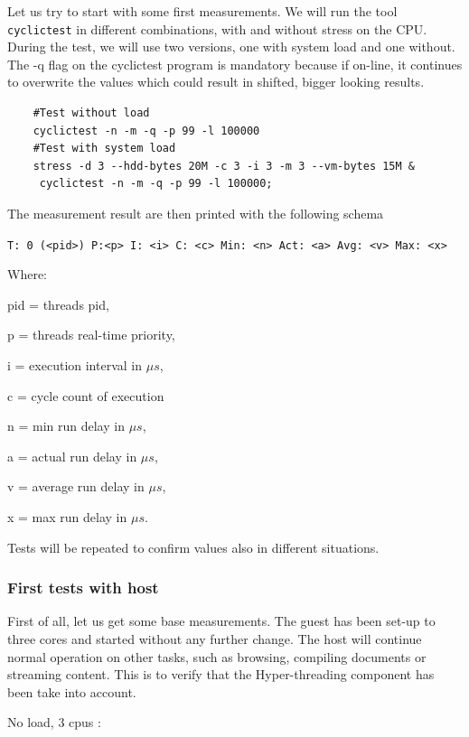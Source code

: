 \documentclass[]{scrartcl}
\begin{document}
Let us try to start with some first measurements. We will run the tool \texttt{cyclictest} in different combinations, with and without stress on the CPU. During the test, we will use two versions, one with system load and one without. The -q flag on the cyclictest program is mandatory because if on-line, it continues to overwrite the values which could result in shifted, bigger looking results.

\begin{verbatim}
	#Test without load
	cyclictest -n -m -q -p 99 -l 100000
	#Test with system load
	stress -d 3 --hdd-bytes 20M -c 3 -i 3 -m 3 --vm-bytes 15M &
	 cyclictest -n -m -q -p 99 -l 100000;
\end{verbatim}

The measurement result are then printed with the following schema
\bigskip

\noindent \small \texttt{T: 0 (<pid>) P:<p> I: <i> C: <c> Min: <n> Act: <a> Avg: <v> Max: <x>}
\bigskip

Where:
\begin{where}
	\item[pid =] threads pid,
	\item[p =] threads real-time priority,
	\item[i =] execution interval in $\mu s$,
	\item[c =] cycle count of execution
	\item[n =] min run delay in $\mu s$,
	\item[a =] actual run delay in $\mu s$,
	\item[v =] average run delay in $\mu s$,
	\item[x =] max run delay in $\mu s$.
\end{where} 

Tests will be repeated to confirm values also in different situations.

\subsubsection{First tests with host}

First of all, let us get some base measurements. The guest has been set-up to three cores
and started without any further change. The host will continue normal operation on other tasks, such as browsing, compiling documents or streaming content. This is to verify that the Hyper-threading component has been take into account.
\bigskip

\noindent No load, 3 cpus :
\end{document}
